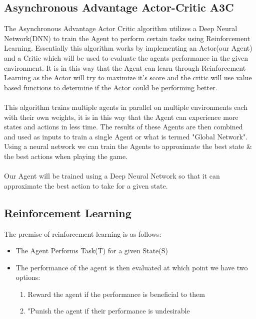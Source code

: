 \documentclass[conference]{IEEEtran}
\begin{document}
\subsection{Asynchronous Advantage Actor-Critic A3C}
The Asynchronous Advantage Actor Critic algorithm utilizes a Deep Neural Network(DNN) to train the Agent to perform certain tasks using Reinforcement Learning\cite{A3CAsyncPaper}. Essentially this algorithm works by implementing an Actor(our Agent) and a Critic which will be used to evaluate the agents performance in the given environment.  It is in this way that the Agent can learn through Reinforcement Learning as the Actor will try to maximize it's score and the critic will use value based functions to determine if the Actor could be performing better.
\\
\\
This algorithm trains multiple agents in parallel on multiple environments each with their own weights, it is in this way that the Agent can experience more states and actions in less time.  The results of these Agents are then combined and used as inputs to train a single Agent or what is termed "Global Network"\cite{A3CAiSummer}.  Using a neural network we can train the Agents to approximate the best state \& the best actions when playing the game.
\\
\\
Our Agent will be trained using a Deep Neural Network so that it can approximate the best action to take for a given state.

\subsection{Reinforcement Learning}

The premise of reinforcement learning is as follows: 
\\
\begin{itemize}
    \item The Agent Performs Task(T) for a given State(S)
    \item The performance of the agent is then evaluated at which point we have two options:
    \begin{enumerate}
        \item Reward the agent if the performance is beneficial to them
        \item "Punish the agent if their performance is undesirable
    \end{enumerate}
\end{itemize}
\end{document}
